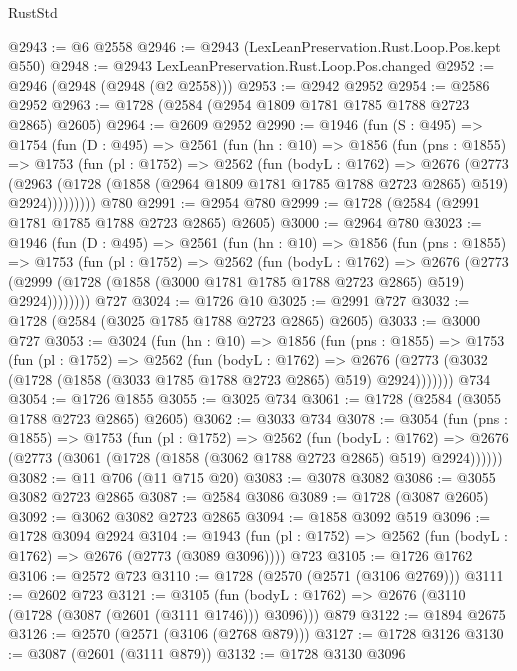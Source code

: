 \begin{lexlean}{RustStd}
\begin{coremodule}
@2943 := @6 @2558
@2946 := @2943 (LexLeanPreservation.Rust.Loop.Pos.kept @550)
@2948 := @2943 LexLeanPreservation.Rust.Loop.Pos.changed
@2952 := @2946 (@2948 (@2948 (@2 @2558)))
@2953 := @2942 @2952
@2954 := @2586 @2952
@2963 := @1728 (@2584 (@2954 @1809 @1781 @1785 @1788 @2723 @2865) @2605)
@2964 := @2609 @2952
@2990 := @1946
    (fun (S : @495) =>
    @1754
      (fun (D : @495) =>
      @2561
        (fun (hn : @10) =>
        @1856
          (fun (pns : @1855) =>
          @1753
            (fun (pl : @1752) =>
            @2562
              (fun (bodyL : @1762) =>
              @2676
                (@2773
                  (@2963
                    (@1728 (@1858 (@2964 @1809 @1781 @1785 @1788 @2723 @2865) @519) @2924)))))))))
    @780
@2991 := @2954 @780
@2999 := @1728 (@2584 (@2991 @1781 @1785 @1788 @2723 @2865) @2605)
@3000 := @2964 @780
@3023 := @1946
    (fun (D : @495) =>
    @2561
      (fun (hn : @10) =>
      @1856
        (fun (pns : @1855) =>
        @1753
          (fun (pl : @1752) =>
          @2562
            (fun (bodyL : @1762) =>
            @2676
              (@2773 (@2999 (@1728 (@1858 (@3000 @1781 @1785 @1788 @2723 @2865) @519) @2924))))))))
    @727
@3024 := @1726 @10
@3025 := @2991 @727
@3032 := @1728 (@2584 (@3025 @1785 @1788 @2723 @2865) @2605)
@3033 := @3000 @727
@3053 := @3024
    (fun (hn : @10) =>
    @1856
      (fun (pns : @1855) =>
      @1753
        (fun (pl : @1752) =>
        @2562
          (fun (bodyL : @1762) =>
          @2676 (@2773 (@3032 (@1728 (@1858 (@3033 @1785 @1788 @2723 @2865) @519) @2924)))))))
    @734
@3054 := @1726 @1855
@3055 := @3025 @734
@3061 := @1728 (@2584 (@3055 @1788 @2723 @2865) @2605)
@3062 := @3033 @734
@3078 := @3054
    (fun (pns : @1855) =>
    @1753
      (fun (pl : @1752) =>
      @2562
        (fun (bodyL : @1762) =>
        @2676 (@2773 (@3061 (@1728 (@1858 (@3062 @1788 @2723 @2865) @519) @2924))))))
@3082 := @11 @706 (@11 @715 @20)
@3083 := @3078 @3082
@3086 := @3055 @3082 @2723 @2865
@3087 := @2584 @3086
@3089 := @1728 (@3087 @2605)
@3092 := @3062 @3082 @2723 @2865
@3094 := @1858 @3092 @519
@3096 := @1728 @3094 @2924
@3104 := @1943 (fun (pl : @1752) => @2562 (fun (bodyL : @1762) => @2676 (@2773 (@3089 @3096)))) @723
@3105 := @1726 @1762
@3106 := @2572 @723
@3110 := @1728 (@2570 (@2571 (@3106 @2769)))
@3111 := @2602 @723
@3121 := @3105
    (fun (bodyL : @1762) => @2676 (@3110 (@1728 (@3087 (@2601 (@3111 @1746))) @3096)))
    @879
@3122 := @1894 @2675
@3126 := @2570 (@2571 (@3106 (@2768 @879)))
@3127 := @1728 @3126
@3130 := @3087 (@2601 (@3111 @879))
@3132 := @1728 @3130 @3096

\end{coremodule}
\end{lexlean}
